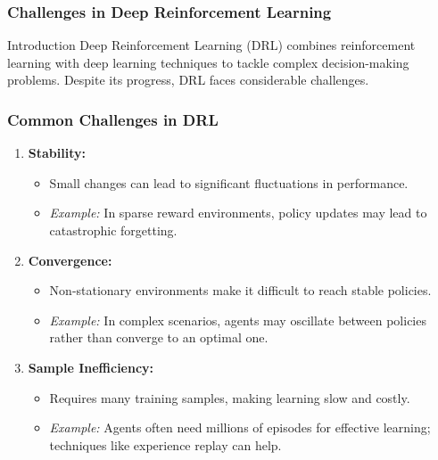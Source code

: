 \documentclass[aspectratio=169]{beamer}
\begin{document}
\begin{frame}
    \frametitle{Challenges in Deep Reinforcement Learning}
    \begin{block}{Introduction}
        Deep Reinforcement Learning (DRL) combines reinforcement learning with deep learning techniques to tackle complex decision-making problems. Despite its progress, DRL faces considerable challenges.
    \end{block}
\end{frame}

\begin{frame}
    \frametitle{Common Challenges in DRL}
    \begin{enumerate}
        \item \textbf{Stability:}
        \begin{itemize}
            \item Small changes can lead to significant fluctuations in performance.
            \item \textit{Example:} In sparse reward environments, policy updates may lead to catastrophic forgetting.
        \end{itemize}

        \item \textbf{Convergence:}
        \begin{itemize}
            \item Non-stationary environments make it difficult to reach stable policies.
            \item \textit{Example:} In complex scenarios, agents may oscillate between policies rather than converge to an optimal one.
        \end{itemize}

        \item \textbf{Sample Inefficiency:}
        \begin{itemize}
            \item Requires many training samples, making learning slow and costly.
            \item \textit{Example:} Agents often need millions of episodes for effective learning; techniques like experience replay can help.
        \end{itemize}
    \end{enumerate}
\end{frame}
\end{document}
